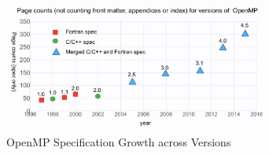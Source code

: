 \begin{figure}
  \centering
  \includegraphics[width=3.4in]{pics/opcounts.png}
  \caption{OpenMP Specification Growth across Versions\label{omppcount}}
\end{figure}



